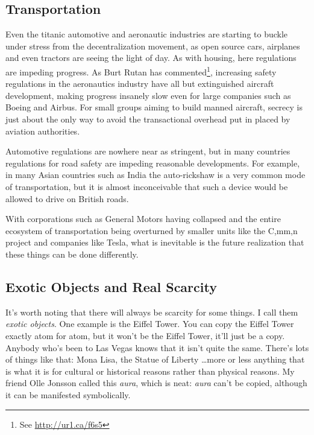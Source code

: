 \subsection{Transportation}
\label{s:artificial_scarcity:burning_bridges:transportation}

Even the titanic automotive and aeronautic industries are starting to buckle
under stress from the decentralization movement, as open source cars, airplanes
and even tractors are seeing the light of day. As with housing, here regulations
are impeding progress. As Burt Rutan has commented\footnote{See
\url{http://ur1.ca/f6s5}}, increasing safety regulations in the aeronautics
industry have all but extinguished aircraft development, making progress
insanely slow even for large companies such as Boeing and Airbus. For small
groups aiming to build manned aircraft, secrecy is just about the only way to
avoid the transactional overhead put in placed by aviation authorities.
    
Automotive regulations are nowhere near as stringent, but in many countries
regulations for road safety are impeding reasonable developments. For example,
in many Asian countries such as India the auto-rickshaw is a very common mode 
of transportation, but it is almost inconceivable that such a device would be
allowed to drive on British roads.

With corporations such as General Motors having collapsed and the entire
ecosystem of transportation being overturned by smaller units like the C,mm,n
project and companies like Tesla, what is inevitable is the future realization
that these things can be done dif\hbox{}ferently.


\subsection{Exotic Objects and Real Scarcity}
\label{s:artificial_scarcity:burning_bridges:exotic_objects}

It's worth noting that there will always be scarcity for some things. I call
them \textit{exotic objects}. One example is the Eif\hbox{}fel Tower. You can
copy the Eif\hbox{}fel Tower exactly atom for atom, but it won't be the
Eif\hbox{}fel Tower, it'll just be a copy. Anybody who's been to Las Vegas 
knows that it isn't quite the same.  There's lots of things like that: Mona
Lisa, the Statue of Liberty \ldots more or less anything that is what it is for
cultural or historical reasons rather than physical reasons. My friend Olle
Jonsson called this \textit{aura}, which is neat: \textit{aura} can't be 
copied, although it can be manifested symbolically.

